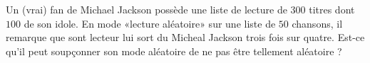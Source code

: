 
\begin{exercice}\label{exosmath-0681}

    Un (vrai) fan de Michael Jackson possède une liste de lecture de \( 300\) titres dont \( 100\) de son idole. En mode «lecture aléatoire» sur une liste de \( 50\) chansons, il remarque que sont lecteur lui sort du Micheal Jackson trois fois sur quatre. Est-ce qu'il peut soupçonner son mode aléatoire de ne pas être tellement aléatoire ?

\end{exercice}
